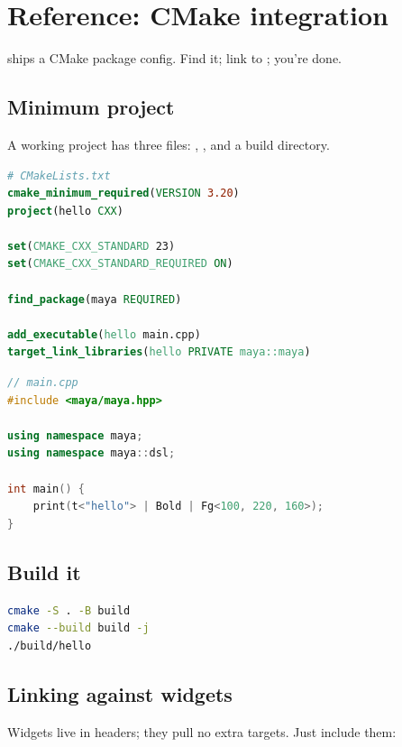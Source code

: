 \chapter{Reference: CMake integration}
\label{ch:refman-cmake}

\begin{aside}
\maya{} ships a CMake package config. Find it; link to
; you're done.
\end{aside}

\section{Minimum project}

A working project has three files: ,
, and a build directory.

\begin{lstlisting}[language=cmake]
# CMakeLists.txt
cmake_minimum_required(VERSION 3.20)
project(hello CXX)

set(CMAKE_CXX_STANDARD 23)
set(CMAKE_CXX_STANDARD_REQUIRED ON)

find_package(maya REQUIRED)

add_executable(hello main.cpp)
target_link_libraries(hello PRIVATE maya::maya)
\end{lstlisting}

\begin{lstlisting}[language=C++]
// main.cpp
#include <maya/maya.hpp>

using namespace maya;
using namespace maya::dsl;

int main() {
    print(t<"hello"> | Bold | Fg<100, 220, 160>);
}
\end{lstlisting}

\section{Build it}

\begin{lstlisting}[language=bash]
cmake -S . -B build
cmake --build build -j
./build/hello
\end{lstlisting}

\section{Linking against widgets}

Widgets live in headers; they pull no extra targets. Just
include them:

